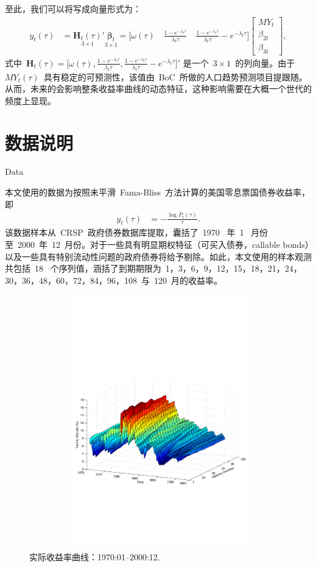   至此，我们可以将写成向量形式为：
  \begin{align}
   y_{t}(\tau) & = \underset{3\times1} {\mathbf{H}_{t}(\tau)}
   {}'{}  \underset{3\times1} {\mathbf{\beta}_t}
   = \big[\omega(\tau)  \quad
   \frac{1-e^{-\lambda_{t} \tau}} {\lambda_{t} \tau} \quad
   \frac{1-e^{-\lambda_{t} \tau}} {\lambda_{t} \tau} - e^{-\lambda_{t} \tau} \big]
   \begin{bmatrix}
     MY_t \\
     \beta_{2t}\\
     \beta_{3t}
   \end{bmatrix},
 \end{align}
 式中~$\mathbf{H}_{t}(\tau)=\big[\omega(\tau),
   \frac{1-e^{-\lambda_{t} \tau}} {\lambda_{t} \tau},
   \frac{1-e^{-\lambda_{t} \tau}} {\lambda_{t} \tau} - e^{-\lambda_{t} \tau} \big]'$ 是一个~$3\times 1$~的列向量。由于~$MY_{t}(\tau)$~具有稳定的可预测性，该值由~BoC~所做的人口趋势预测项目提跟随。从而，未来的\dsf 会影响整条收益率曲线的动态特征，这种影响需要在大概一个世代的频度上显现。

\section{数据说明}{Data}

本文使用的数据为按照未平滑~Fama-Bliss~方法计算的美国零息票国债券收益率，即
\begin{align}
  y_t(\tau) &= -\frac{\log P_t(\tau)}{\tau}.
\end{align}
该数据样本从~CRSP~政府债券数据库提取，囊括了~1970~ 年~1~ 月份至~2000~年~12~月份。对于一些具有明显期权特征（可买入债券，callable bonds）以及一些具有特别流动性问题的政府债券将给予剔除。如此，本文使用的样本观测共包括~18~ 个序列值，涵括了到期期限为~1，3，6，9，12，15，18，21，24，30，36，48，60，72，84，96，108~与~120~月的收益率。

    \begin{figure}%
    \includegraphics[width=15.5cm,height=11cm]{figures/tale_fig04}
   \caption{实际收益率曲线：1970:01--2000:12.}
   \label{tale_fig04}
  \end{figure}

